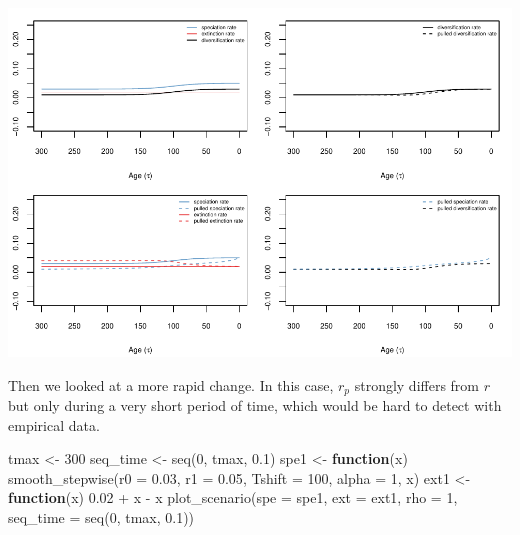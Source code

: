 \documentclass[
]{article}
\newenvironment{Shaded}{\begin{snugshade}}{\end{snugshade}}
\newcommand{\AttributeTok}[1]{\textcolor[rgb]{0.77,0.63,0.00}{#1}}
\newcommand{\ControlFlowTok}[1]{\textcolor[rgb]{0.13,0.29,0.53}{\textbf{#1}}}
\newcommand{\DecValTok}[1]{\textcolor[rgb]{0.00,0.00,0.81}{#1}}
\newcommand{\FloatTok}[1]{\textcolor[rgb]{0.00,0.00,0.81}{#1}}
\newcommand{\FunctionTok}[1]{\textcolor[rgb]{0.00,0.00,0.00}{#1}}
\newcommand{\NormalTok}[1]{#1}
\newcommand{\OtherTok}[1]{\textcolor[rgb]{0.56,0.35,0.01}{#1}}
\newcommand{\SpecialCharTok}[1]{\textcolor[rgb]{0.00,0.00,0.00}{#1}}
\begin{document}
\includegraphics{supplement_files/figure-latex/unnamed-chunk-6-1.pdf}

\pagebreak

Then we looked at a more rapid change. In this case, \(r_p\) strongly
differs from \(r\) but only during a very short period of time, which
would be hard to detect with empirical data.

\begin{Shaded}
\begin{Highlighting}[]
\NormalTok{tmax }\OtherTok{\textless{}{-}} \DecValTok{300}
\NormalTok{seq\_time }\OtherTok{\textless{}{-}} \FunctionTok{seq}\NormalTok{(}\DecValTok{0}\NormalTok{, tmax, }\FloatTok{0.1}\NormalTok{)}
\NormalTok{spe1 }\OtherTok{\textless{}{-}} \ControlFlowTok{function}\NormalTok{(x) }\FunctionTok{smooth\_stepwise}\NormalTok{(}\AttributeTok{r0 =} \FloatTok{0.03}\NormalTok{, }\AttributeTok{r1 =} \FloatTok{0.05}\NormalTok{, }\AttributeTok{Tshift =} \DecValTok{100}\NormalTok{,}
    \AttributeTok{alpha =} \DecValTok{1}\NormalTok{, x)}
\NormalTok{ext1 }\OtherTok{\textless{}{-}} \ControlFlowTok{function}\NormalTok{(x) }\FloatTok{0.02} \SpecialCharTok{+}\NormalTok{ x }\SpecialCharTok{{-}}\NormalTok{ x}
\FunctionTok{plot\_scenario}\NormalTok{(}\AttributeTok{spe =}\NormalTok{ spe1, }\AttributeTok{ext =}\NormalTok{ ext1, }\AttributeTok{rho =} \DecValTok{1}\NormalTok{, }\AttributeTok{seq\_time =} \FunctionTok{seq}\NormalTok{(}\DecValTok{0}\NormalTok{,}
\NormalTok{    tmax, }\FloatTok{0.1}\NormalTok{))}
\end{Highlighting}
\end{Shaded}
\end{document}
